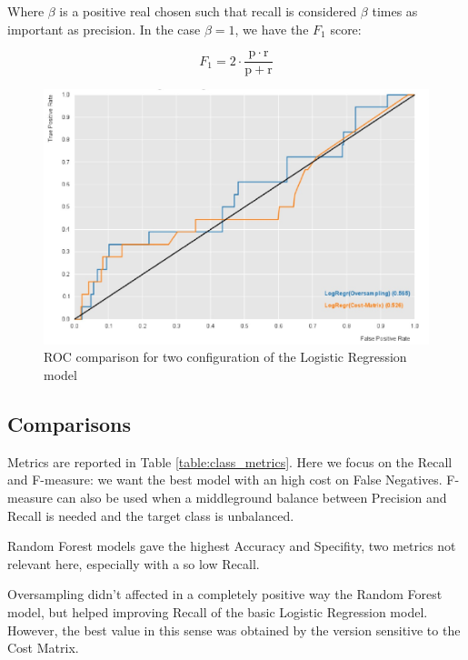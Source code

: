 Where $\beta$ is a positive real chosen such that recall is considered $\beta$ times as important as precision. In the case $\beta = 1$, we have the $F_1$ score:

\begin{equation}
    F_1 = 2 \cdot \frac{\mathrm{p} \cdot \mathrm{r}}{\mathrm{p} + \mathrm{r}}
\end{equation}

\begin{figure}
    \centerline{
        \includegraphics[width=0.4\paperwidth]{figures/roc1.png}}
    \caption{ROC comparison for two configuration of the Logistic Regression model}
    \label{roc}
\end{figure}

\subsection{Comparisons}

Metrics are reported in Table \ref{table:class_metrics}. Here we focus on the Recall and F-measure: we want the best model with an high cost on False Negatives. F-measure can also be used when a middleground balance between Precision and Recall is needed and the target class is unbalanced.

Random Forest models gave the highest Accuracy and Specifity, two metrics not relevant here, especially with a so low Recall.

Oversampling didn't affected in a completely positive way the Random Forest model, but helped improving Recall of the basic Logistic Regression model. However, the best value in this sense was obtained by the version sensitive to the Cost Matrix.

